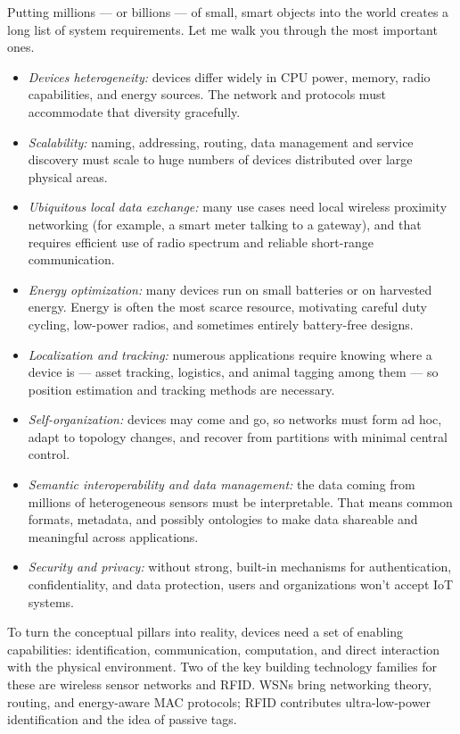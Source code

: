 Putting millions — or billions — of small, smart objects into the world creates a long list of system requirements. Let me walk you through the most important ones.
\begin{itemize}
    \item \textit{Devices heterogeneity:} devices differ widely in CPU power, memory, radio capabilities, and energy sources. The network and protocols must accommodate that diversity gracefully.
    \item \textit{Scalability:} naming, addressing, routing, data management and service discovery must scale to huge numbers of devices distributed over large physical areas.
    \item \textit{Ubiquitous local data exchange:} many use cases need local wireless proximity networking (for example, a smart meter talking to a gateway), and that requires efficient use of radio spectrum and reliable short-range communication.
    \item \textit{Energy optimization:} many devices run on small batteries or on harvested energy. Energy is often the most scarce resource, motivating careful duty cycling, low-power radios, and sometimes entirely battery-free designs.
    \item \textit{Localization and tracking:} numerous applications require knowing where a device is — asset tracking, logistics, and animal tagging among them — so position estimation and tracking methods are necessary.
    \item \textit{Self-organization:} devices may come and go, so networks must form ad hoc, adapt to topology changes, and recover from partitions with minimal central control.
    \item \textit{Semantic interoperability and data management:} the data coming from millions of heterogeneous sensors must be interpretable. That means common formats, metadata, and possibly ontologies to make data shareable and meaningful across applications.
    \item \textit{Security and privacy:} without strong, built-in mechanisms for authentication, confidentiality, and data protection, users and organizations won’t accept IoT systems.
\end{itemize}
To turn the conceptual pillars into reality, devices need a set of enabling capabilities: identification, communication, computation, and direct interaction with the physical environment. Two of the key building technology families for these are wireless sensor networks and RFID. WSNs bring networking theory, routing, and energy-aware MAC protocols; RFID contributes ultra-low-power identification and the idea of passive tags. 

